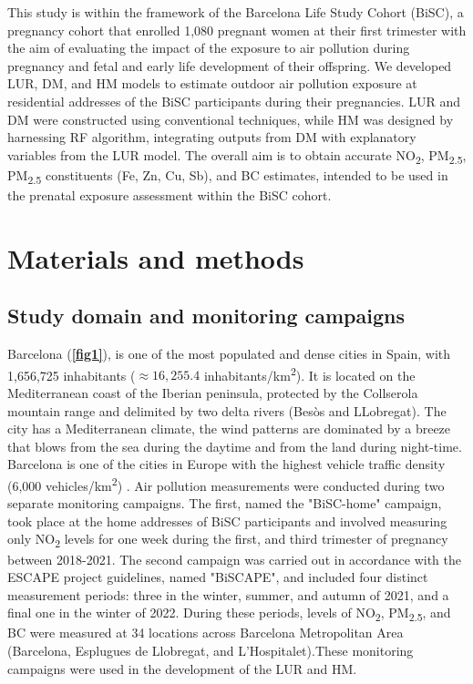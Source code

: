 \documentclass{article}
\begin{document}
This study is within the framework of the Barcelona Life Study Cohort (BiSC), a pregnancy cohort that enrolled 1,080 pregnant women at their first trimester with the aim of evaluating the impact of the exposure to air pollution during pregnancy and fetal and early life development of their offspring. We developed LUR, DM, and HM models to estimate outdoor air pollution exposure at residential addresses of the BiSC participants during their pregnancies. LUR and DM were constructed using conventional techniques, while HM was designed by harnessing RF algorithm, integrating outputs from DM with explanatory variables from the LUR model. The overall aim is to obtain accurate NO\textsubscript{2}, PM\textsubscript{2.5}, PM\textsubscript{2.5} constituents (Fe, Zn, Cu, Sb), and BC estimates, intended to be used in the prenatal exposure assessment within the BiSC cohort. 

\section{Materials and methods}

\subsection{Study domain and monitoring campaigns}

Barcelona (\textbf{\cref{fig1}}), is one of the most populated and dense cities in Spain, with 1,656,725 inhabitants ($\approx16,255.4$ inhabitants/km\textsuperscript{2}). It is located on the Mediterranean coast of the Iberian peninsula, protected by the Collserola mountain range and delimited by two delta rivers (Besòs and LLobregat). The city has a Mediterranean climate, the wind patterns are dominated by a breeze that blows from the sea during the daytime and from the land during night-time. Barcelona is one of the cities in Europe with the highest vehicle traffic density (6,000 vehicles/km\textsuperscript{2}) \cite{casallas2018}. Air pollution measurements were conducted during two separate monitoring campaigns. The first, named the "BiSC-home" campaign, took place at the home addresses of BiSC participants and involved measuring only NO\textsubscript{2} levels for one week during the first, and third trimester of pregnancy between 2018-2021. The second campaign was carried out in accordance with the ESCAPE project guidelines, named "BiSCAPE", and included four distinct measurement periods: three in the winter, summer, and autumn of 2021, and a final one in the winter of 2022. During these periods, levels of NO\textsubscript{2}, PM\textsubscript{2.5}, and BC were measured at 34 locations across Barcelona Metropolitan Area (Barcelona, Esplugues de Llobregat, and L'Hospitalet).These monitoring campaigns were used in the development of the LUR and HM.
\end{document}
